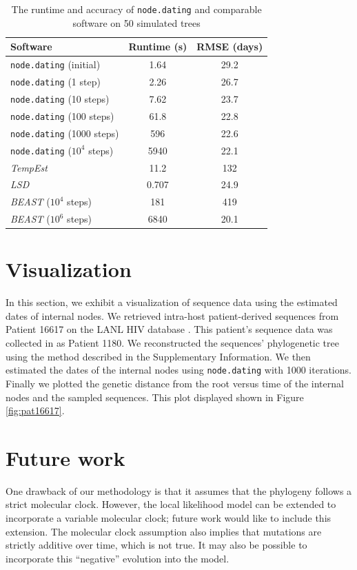 \documentclass{bioinfo}
\newcommand{\code}[1]{{\tt #1}}
\begin{document}
\begin{table}[t]
	\caption[Runtime and accuracy]{The runtime and accuracy of \code{node.dating} and comparable software on 50 simulated trees}
	\label{tab:runtime}
	\centering
	\begin{tabular}{lcc}
		\hline
		Software & Runtime (s) & RMSE (days) \\
		\hline
		\code{node.dating} (initial) & 1.64 & 29.2 \\
		\code{node.dating} (1 step) & 2.26 & 26.7 \\
		\code{node.dating} (10 steps) & 7.62 & 23.7 \\
		\code{node.dating} (100 steps) & 61.8 & 22.8 \\
		\code{node.dating} (1000 steps) & 596 & 22.6 \\
		\code{node.dating} ($10^4$ steps) & 5940 & 22.1 \\
		\emph{TempEst} & 11.2 & 132 \\
		\emph{LSD} & 0.707 & 24.9 \\
		\emph{BEAST} ($10^4$ steps) & 181 & 419 \\
		\emph{BEAST} ($10^6$ steps) & 6840 & 20.1 \\
		\hline
	\end{tabular}
\end{table}

\section{Visualization} \label{sec:vis}
In this section, we exhibit a visualization of sequence data using the estimated dates of internal nodes.
We retrieved intra-host patient-derived sequences from Patient 16617 on the LANL HIV database \citep{LosAlamos}.
This patient's sequence data was collected in \cite{Llewellyn06} as Patient 1180.
We reconstructed the sequences' phylogenetic tree using the method described in the Supplementary Information.
We then estimated the dates of the internal nodes using \code{node.dating} with 1000 iterations. Finally we plotted the genetic distance from the root versus time of the internal nodes and the sampled sequences. This plot displayed shown in Figure \ref{fig:pat16617}.

\section{Future work} \label{sec:discuss}
One drawback of our methodology is that it assumes that the phylogeny follows a strict molecular clock.
However, the local likelihood model can be extended to incorporate a variable molecular clock; future work would like to include this extension.
The molecular clock assumption also implies that mutations \showthe\parskip are strictly additive over time, which is not true.
It may also be possible to incorporate this ``negative'' evolution into the model.
\end{document}
